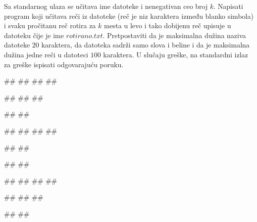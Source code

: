 \begin{Exercise}[label=p3_id18]         
Sa standarnog ulaza se učitava ime datoteke i nenegativan ceo
broj $k$. Napisati program koji učitava reči iz datoteke (reč je niz karaktera između blanko simbola) i svaku pročitanu reč
rotira za $k$ mesta u levo i tako dobijenu reč upisuje u datoteku čije je ime $rotirano.txt$. 
Pretpostaviti da je maksimalna dužina naziva datoteke $20$ karaktera, da
datoteka sadrži samo slova i beline i da je maksimalna dužina jedne reči u datoteci $100$ karaktera.
U slučaju greške, na standardni izlaz za greške ispisati odgovarajuću poruku.

\begin{minitest}
\begin{upotreba}{1}
#\naslovInt#
##
##
##

##
##
##

##
##
\end{upotreba}
\end{minitest}
\begin{minitest}
\begin{upotreba}{2}
#\naslovInt#
##
##
##

##
##

##
##
\end{upotreba}
\end{minitest}
\begin{minitest}
\begin{upotreba}{3}
#\naslovInt#
##
##
##

##
##
##

##
##
\end{upotreba}
\end{minitest}

\end{Exercise}
\begin{Answer}[ref=p3_id18]
\end{Answer}


